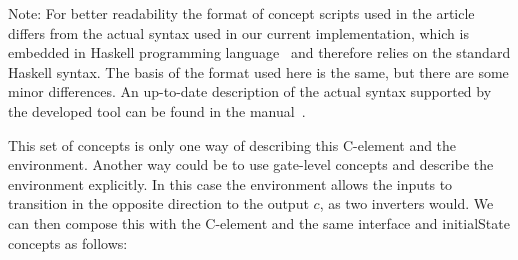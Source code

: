 \documentclass[british,compsoc]{IEEEtran}
\begin{document}

Note: For better readability the format of concept scripts used in the article
differs from the actual syntax used in our current implementation, which is
embedded in Haskell programming language~\cite{1996_hudak_dsl} and therefore
relies on the standard Haskell syntax. The basis of the format used here is the
same, but there are some minor differences. An up-to-date description of the
actual syntax supported by the developed tool can be found in the
manual~\cite{2016_concepts_github}.


This set of concepts is only one way of describing this C-element
and the environment. Another way could be to use gate-level concepts
and describe the environment explicitly. In this case the environment
allows the inputs to transition in the opposite direction to the output
$c$, as two inverters would. We can then compose this with the C-element
and the same \textsf{interface} and \textsf{initialState} concepts as follows:
\end{document}
